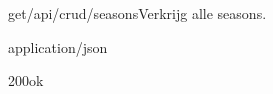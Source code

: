\documentclass[10pt]{article}
\begin{document}
\begin{apiRoute}{get}{/api/crud/seasons}{Verkrijg alle seasons.}
	\begin{routeResponse}{application/json}
		\begin{routeResponseItem}{200}{ok}
			\begin{routeResponseItemBody}
			\end{routeResponseItemBody}
		\end{routeResponseItem}
	\end{routeResponse}
\end{apiRoute}
\end{document}
